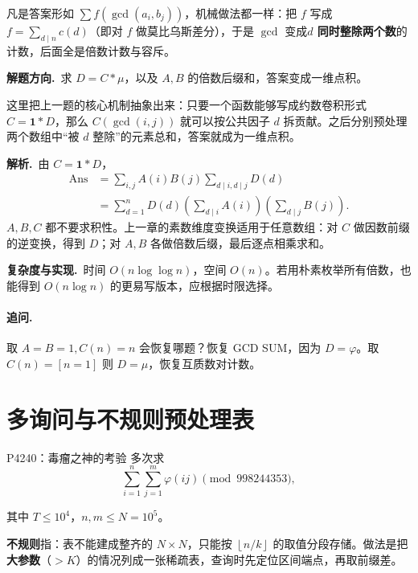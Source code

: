 \documentclass[UTF8,a4paper,11pt,twoside,openright,fontset=fandol]{ctexbook}
\theoremstyle{definition}
\newcommand{\one}{\mathbf 1}
\newcommand{\floor}[1]{\left\lfloor #1\right\rfloor}
\newcommand{\sol}{\par\noindent\textbf{解析.}\ }
\newcommand{\hint}{\par\noindent\textbf{解题方向.}\ }
\newcommand{\cost}{\par\noindent\textbf{复杂度与实现.}\ }
\begin{document}
\begin{tip}
凡是答案形如 $\sum f(\gcd(a_i,b_j))$，机械做法都一样：把 $f$ 写成 $f=\sum_{d\mid n}c(d)$（即对 $f$ 做莫比乌斯差分），于是 $\gcd$ 变成\textbf{$d$ 同时整除两个数}的计数，后面全是倍数计数与容斥。
\end{tip}

\hint 求 $D=C*\mu$，以及 $A,B$ 的倍数后缀和，答案变成一维点积。

\begin{pitfall}[讲解：先看这题到底在做什么]
这里把上一题的核心机制抽象出来：只要一个函数能够写成约数卷积形式 $C=\one*D$，那么 $C(\gcd(i,j))$ 就可以按公共因子 $d$ 拆贡献。之后分别预处理两个数组中“被 $d$ 整除”的元素总和，答案就成为一维点积。
\end{pitfall}

\sol 由 $C=\one*D$，
\[
\begin{aligned}
\mathrm{Ans}
&=\sum_{i,j}A(i)B(j)\sum_{d\mid i,d\mid j}D(d)\\
&=\sum_{d=1}^nD(d)
 \left(\sum_{d\mid i}A(i)\right)
 \left(\sum_{d\mid j}B(j)\right).
\end{aligned}
\]
$A,B,C$ 都不要求积性。上一章的素数维度变换适用于任意数组：对 $C$ 做因数前缀的逆变换，得到 $D$；对 $A,B$ 各做倍数后缀，最后逐点相乘求和。
\cost 时间 $O(n\log\log n)$，空间 $O(n)$。若用朴素枚举所有倍数，也能得到 $O(n\log n)$ 的更易写版本，应根据时限选择。
\paragraph{追问.} 取 $A=B=1,C(n)=n$ 会恢复哪题？恢复 GCD SUM，因为 $D=\varphi$。取 $C(n)=[n=1]$ 则 $D=\mu$，恢复互质数对计数。


\section{多询问与不规则预处理表}
\begin{problem}{P4240：毒瘤之神的考验}
多次求
\[
 \sum_{i=1}^n\sum_{j=1}^m\varphi(ij)\pmod{998244353},
\]


其中 $T\le10^4$，$n,m\le N=10^5$。
\end{problem}

\begin{tip}[词义：不规则的预处理表]
\textbf{不规则}指：表不能建成整齐的 $N\times N$，只能按 $\floor{n/k}$ 的取值分段存储。做法是把\textbf{大参数}（$>K$）的情况列成一张稀疏表，查询时先定位区间端点，再取前缀差。
\end{tip}
\end{document}
